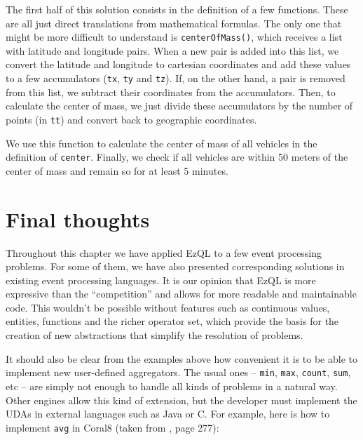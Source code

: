 The first half of this solution consists in the definition of a few
functions. These are all just direct translations from mathematical
formulas. The only one that might be more difficult to understand is
\verb=centerOfMass()=, which receives a list with latitude and
longitude pairs. When a new pair is added into this list, we convert
the latitude and longitude to cartesian coordinates and add these
values to a few accumulators (\verb=tx=, \verb=ty= and \verb=tz=). If,
on the other hand, a pair is removed from this list, we subtract their
coordinates from the accumulators. Then, to calculate the center of
mass, we just divide these accumulators by the number of points (in
\verb=tt=) and convert back to geographic coordinates.

We use this function to calculate the center of mass of all vehicles
in the definition of \verb=center=. Finally, we check if all vehicles
are within 50 meters of the center of mass and remain so for at least
5 minutes.

\section{Final thoughts}

Throughout this chapter we have applied EzQL to a few event processing
problems. For some of them, we have also presented corresponding
solutions in existing event processing languages. It is our opinion
that EzQL is more expressive than the ``competition'' and allows for
more readable and maintainable code. This wouldn't be possible without
features such as continuous values, entities, functions and the richer
operator set, which provide the basis for the creation of new
abstractions that simplify the resolution of problems.

It should also be clear from the examples above how convenient it is
to be able to implement new user-defined aggregators. The usual ones
-- \verb=min=, \verb=max=, \verb=count=, \verb=sum=, etc -- are simply
not enough to handle all kinds of problems in a natural way. Other
engines allow this kind of extension, but the developer must implement
the UDAs in external languages such as Java or C. For example, here is
how to implement \verb=avg= in Coral8 (taken from
\cite{coral8-integration-guide}, page 277):


